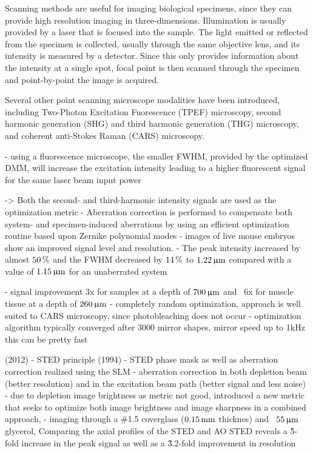 Scanning methods are useful for imaging biological specimens, since they can provide high resolution imaging in three-dimensions. Illumination is  usually provided by a laser that is focused into the sample. The light emitted or reflected from the specimen is collected, usually through the same objective lens, and its intensity is measured by a detector. Since this only provides information about the intensity at a single spot, focal point is then scanned through the specimen and point-by-point the image is acquired. 

Several other point scanning microscope modalities have been introduced, including Two-Photon Excitation Fuorescence (TPEF) microscopy, second harmonic generation (SHG) and third harmonic generation (THG) microscopy, and coherent anti-Stokes Raman (CARS) microscopy.

- using a fluorescence microscope, the smaller FWHM, provided by the optimized DMM, will increase the excitation intensity leading to a higher fluorescent signal for the same laser beam input power

\cite{scan_HG_embryos,scan_HG_dynamic} -> Both the second- and third-harmonic intensity signals are used as the optimization metric
- Aberration correction is performed to compensate both system- and specimen-induced aberrations by using an efficient optimization routine based upon Zernike polynomial modes
- images of live mouse embryos show an improved signal level and resolution.
- The peak intensity increased by almost $\unit[50]{\%}$ and the FWHM decreased by $\unit[14]{\%}$ to  $\unit[1.22]{\upmu m}$ compared with a value of $\unit[1.15]{\upmu m}$ for an unaberrated system

\cite{scan_CARS} - signal improvement 3x for samples at a depth of $\unit[700]{\upmu m}$ and ~6x for muscle tissue at a depth of $\unit[260]{\upmu m}$
- completely random optimization, approach is well suited to CARS microscopy, since photobleaching does not occur 
- optimization algorithm typically converged after 3000 mirror shapes, mirror speed up to 1kHz this can be pretty fast

\cite{scan_STED} (2012) - STED principle \cite{scan_STED_principle} (1994) 
- STED phase mask as well as aberration correction realized using the SLM
- aberration correction in both depletion beam (better resolution) and in the excitation beam path (better signal and less noise)
- due to depletion image brightness as metric not good, introduced a new metric that seeks to optimize both image brightness and image sharpness in a combined approach,
- imaging through a \#1.5 coverglass ($\unit[0.15]{mm}$ thicknes) and ~$\unit[55]{\upmu m}$ glycerol, Comparing the axial profiles of the STED and AO STED reveals a \~5-fold increase in the peak signal as well as a \~3.2-fold improvement in resolution 




